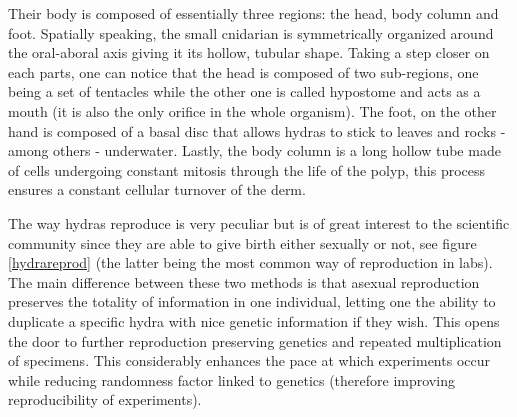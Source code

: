 Their body is composed of essentially three regions: the head, body column and foot. Spatially speaking, the small cnidarian is symmetrically organized around the oral-aboral axis giving it its hollow, tubular shape. Taking a step closer on each parts, one can notice that the head is composed of two sub-regions, one being a set of tentacles while the other one is called hypostome and acts as a mouth (it is also the only orifice in the whole organism). The foot, on the other hand is composed of a basal disc that allows hydras to stick to leaves and rocks - among others - underwater. Lastly, the body column is a long hollow tube made of cells undergoing constant mitosis through the life of the polyp, this process ensures a constant cellular turnover of the derm.

\begin{remark}
	The way hydras reproduce is very peculiar but is of great interest to the scientific community since they are able to give birth either sexually or not, see figure \ref{hydrareprod} (the latter being the most common way of reproduction in labs). The main difference between these two methods is that asexual reproduction preserves the totality of information in one individual, letting one the ability to duplicate a specific hydra with nice genetic information if they wish. This opens the door to further reproduction preserving genetics and repeated multiplication of specimens. This considerably enhances the pace at which experiments occur while reducing randomness factor linked to genetics (therefore improving reproducibility of experiments). 
\end{remark}


